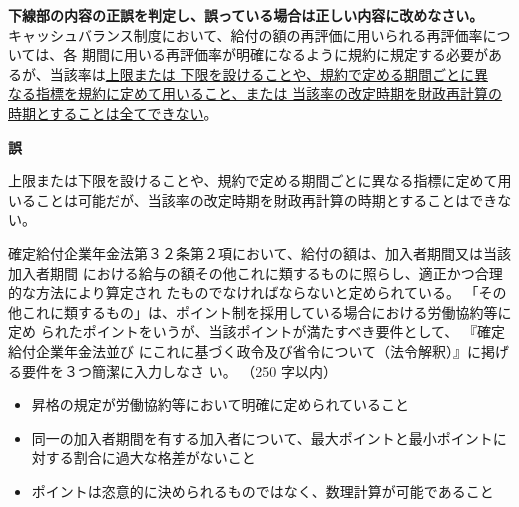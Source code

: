 \begin{truefalse}[年金1 2021 問題1(3)\textcircled{4}]
      \textbf{下線部の内容の正誤を判定し、誤っている場合は正しい内容に改めなさい。}
  \\

  キャッシュバランス制度において、給付の額の再評価に用いられる再評価率については、各
期間に用いる再評価率が明確になるように規約に規定する必要があるが、当該率は\underline{上限または
下限を設けることや、規約で定める期間ごとに異}\\
\underline{なる指標を規約に定めて用いること、または
当該率の改定時期を財政再計算の時期とすることは全てできない}。
\end{truefalse}

\begin{answerbox}
  \textbf{誤}

上限または下限を設けることや、規約で定める期間ごとに異なる指標に定めて用いることは可能だが、当該率の改定時期を財政再計算の時期とすることはできない。
\end{answerbox}


\begin{shortanswer}[年金1 2023 問題2(1)エ]
  確定給付企業年金法第３２条第２項において、給付の額は、加入者期間又は当該加入者期間
における給与の額その他これに類するものに照らし、適正かつ合理的な方法により算定され
たものでなければならないと定められている。
「その他これに類するもの」は、ポイント制を採用している場合における労働協約等に定め
られたポイントをいうが、当該ポイントが満たすべき要件として、 『確定給付企業年金法並び
にこれに基づく政令及び省令について（法令解釈）』に掲げる要件を３つ簡潔に入力しなさ
い。 （250 字以内）
\end{shortanswer}

\begin{answerbox}
  \begin{itemize}
    \item 昇格の規定が労働協約等において明確に定められていること
    \item 同一の加入者期間を有する加入者について、最大ポイントと最小ポイントに対する割合に過大な格差がないこと
    \item ポイントは恣意的に決められるものではなく、数理計算が可能であること
  \end{itemize}
\end{answerbox}

